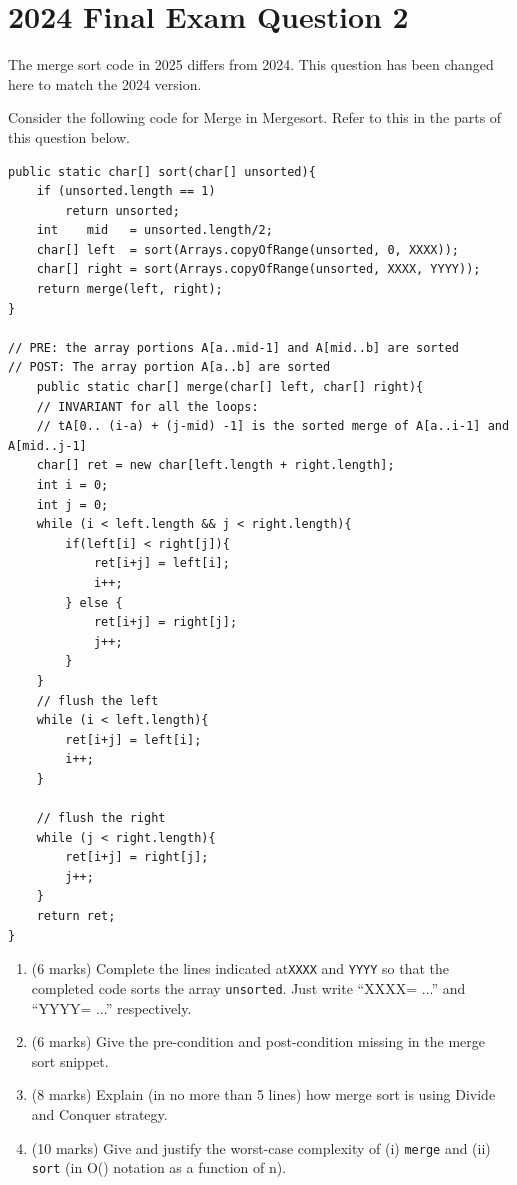 \documentclass[twoside=false,DIV=14]{scrartcl}
\begin{document}
\section{2024 Final Exam Question 2}
\begin{note}
The merge sort code in 2025 differs from 2024. This question has been changed here to match the 2024 version.
\end{note}
Consider the following code for Merge in Mergesort. Refer to this in the parts of this question below.
{\small\begin{lstlisting}
public static char[] sort(char[] unsorted){
    if (unsorted.length == 1)
        return unsorted;
    int    mid   = unsorted.length/2;
    char[] left  = sort(Arrays.copyOfRange(unsorted, 0, XXXX));
    char[] right = sort(Arrays.copyOfRange(unsorted, XXXX, YYYY));
    return merge(left, right);
}

// PRE: the array portions A[a..mid-1] and A[mid..b] are sorted
// POST: The array portion A[a..b] are sorted
    public static char[] merge(char[] left, char[] right){
    // INVARIANT for all the loops:
    // tA[0.. (i-a) + (j-mid) -1] is the sorted merge of A[a..i-1] and A[mid..j-1]
    char[] ret = new char[left.length + right.length];
    int i = 0;
    int j = 0;
    while (i < left.length && j < right.length){
        if(left[i] < right[j]){
            ret[i+j] = left[i];
            i++;
        } else {
            ret[i+j] = right[j];
            j++;                
        }
    }
    // flush the left
    while (i < left.length){
        ret[i+j] = left[i];
        i++;
    }

    // flush the right
    while (j < right.length){
        ret[i+j] = right[j];
        j++;
    }
    return ret;
}
\end{lstlisting}}
\begin{enumerate}
\item (6 marks) Complete the lines indicated at\verb+XXXX+ and \verb+YYYY+ so that the completed code sorts the array \verb+unsorted+. Just write “XXXX= ...” and “YYYY= ...” respectively.
\item (6 marks) Give the pre-condition and post-condition missing in the merge sort snippet.
\item (8 marks) Explain (in no more than 5 lines) how merge sort is using Divide and Conquer
strategy.
\item (10 marks) Give and justify the worst-case complexity of (i) \verb+merge+ and (ii) \verb+sort+
(in O() notation as a function of n).
\end{enumerate}
 
\end{document}
